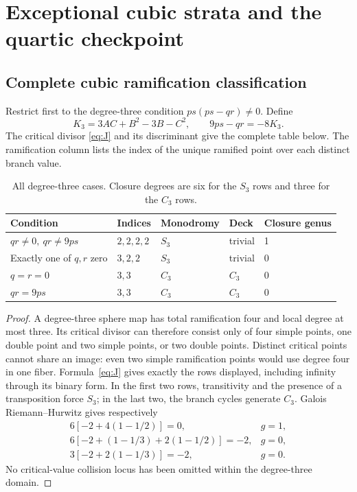 \section{Exceptional cubic strata and the quartic checkpoint}\label{sec:exceptions}
\subsection{Complete cubic ramification classification}
Restrict first to the degree-three condition \(ps(ps-qr)\ne0\). Define
\begin{equation}\label{eq:K3}
 K_3=3AC+B^2-3B-C^2,\qquad 9ps-qr=-8K_3.
\end{equation}
The critical divisor \eqref{eq:J} and its discriminant give the complete table below. The ramification column lists the index of the unique ramified point over each distinct branch value.
\begin{table}[htbp]\centering\small
\begin{tabularx}{\linewidth}{Yllll}\toprule
Condition & Indices & Monodromy & Deck & Closure genus\\\midrule
\(qr\ne0,\ qr\ne9ps\) & \(2,2,2,2\) & \(S_3\) & trivial & 1\\
Exactly one of \(q,r\) zero & \(3,2,2\) & \(S_3\) & trivial & 0\\
\(q=r=0\) & \(3,3\) & \(C_3\) & \(C_3\) & 0\\
\(qr=9ps\) & \(3,3\) & \(C_3\) & \(C_3\) & 0\\\bottomrule
\end{tabularx}
\caption{All degree-three cases. Closure degrees are six for the \(S_3\) rows and three for the \(C_3\) rows.}\label{tab:cubic_strata}
\end{table}

\begin{proof}
A degree-three sphere map has total ramification four and local degree at most three. Its critical divisor can therefore consist only of four simple points, one double point and two simple points, or two double points. Distinct critical points cannot share an image: even two simple ramification points would use degree four in one fiber. Formula~\eqref{eq:J} gives exactly the rows displayed, including infinity through its binary form. In the first two rows, transitivity and the presence of a transposition force \(S_3\); in the last two, the branch cycles generate \(C_3\). Galois Riemann--Hurwitz gives respectively
\begin{equation}\label{eq:RH_strata}
 \begin{array}{ll}
 6[-2+4(1-1/2)]=0,&g=1,\\
 6[-2+(1-1/3)+2(1-1/2)]=-2,&g=0,\\
 3[-2+2(1-1/3)]=-2,&g=0.
 \end{array}
\end{equation}
No critical-value collision locus has been omitted within the degree-three domain.
\end{proof}

